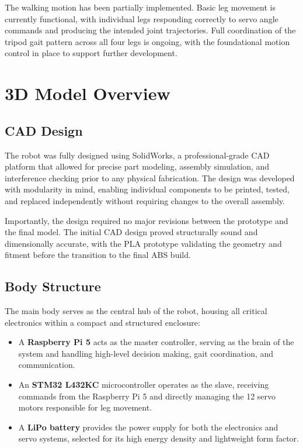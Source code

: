 \documentclass{article}
\begin{document}
The walking motion has been partially implemented. Basic leg movement is currently functional, with individual legs responding correctly to servo angle commands and producing the intended joint trajectories. Full coordination of the tripod gait pattern across all four legs is ongoing, with the foundational motion control in place to support further development.

\section{3D Model Overview}

\subsection*{CAD Design}

The robot was fully designed using SolidWorks, a professional-grade CAD platform that allowed for precise part modeling, assembly simulation, and interference checking prior to any physical fabrication. The design was developed with modularity in mind, enabling individual components to be printed, tested, and replaced independently without requiring changes to the overall assembly.

Importantly, the design required no major revisions between the prototype and the final model. The initial CAD design proved structurally sound and dimensionally accurate, with the PLA prototype validating the geometry and fitment before the transition to the final ABS build.

\subsection*{Body Structure}

The main body serves as the central hub of the robot, housing all critical electronics within a compact and structured enclosure:

\begin{itemize}
    \item A \textbf{Raspberry Pi 5} acts as the master controller, serving as the brain of the system and handling high-level decision making, gait coordination, and communication.
    \item An \textbf{STM32 L432KC} microcontroller operates as the slave, receiving commands from the Raspberry Pi 5 and directly managing the 12 servo motors responsible for leg movement.
    \item A \textbf{LiPo battery} provides the power supply for both the electronics and servo systems, selected for its high energy density and lightweight form factor.
\end{itemize}
\end{document}
